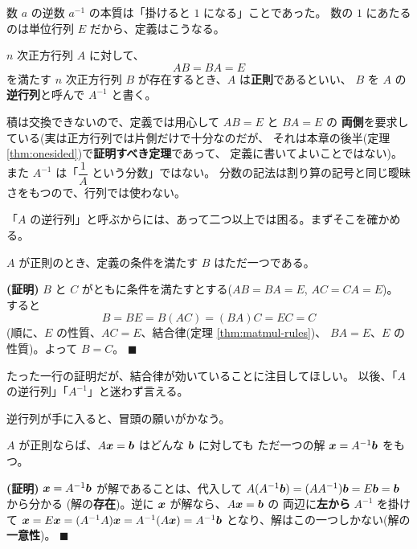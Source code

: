 数 $a$ の逆数 $a^{-1}$ の本質は「掛けると $1$ になる」ことであった。
数の $1$ にあたるのは単位行列 $E$ だから、定義はこうなる。

\begin{teigi}[逆行列]
$n$ 次正方行列 $A$ に対して、
\[
AB = BA = E
\]
を満たす $n$ 次正方行列 $B$ が存在するとき、$A$ は\textbf{正則}であるといい、
$B$ を $A$ の\textbf{逆行列}と呼んで $A^{-1}$ と書く。
\end{teigi}

\begin{chui}
積は交換できないので、定義では用心して $AB = E$ と $BA = E$ の
\textbf{両側}を要求している(実は正方行列では片側だけで十分なのだが、
それは本章の後半(定理 \ref{thm:onesided})で\textbf{証明すべき定理}であって、
定義に書いてよいことではない)。
また $A^{-1}$ は「$\dfrac{1}{A}$ という分数」ではない。
分数の記法は割り算の記号と同じ曖昧さをもつので、行列では使わない。
\end{chui}

「$A$ の逆行列」と呼ぶからには、あって二つ以上では困る。まずそこを確かめる。

\begin{teiri}[逆行列の一意性]\label{thm:inv-unique}
$A$ が正則のとき、定義の条件を満たす $B$ はただ一つである。
\end{teiri}

\noindent\textbf{(証明)}\quad
$B$ と $C$ がともに条件を満たすとする($AB = BA = E$, $AC = CA = E$)。
すると
\[
B = BE = B(AC) = (BA)C = EC = C
\]
(順に、$E$ の性質、$AC = E$、結合律(定理 \ref{thm:matmul-rules})、
$BA = E$、$E$ の性質)。よって $B = C$。 $\blacksquare$

たった一行の証明だが、結合律が効いていることに注目してほしい。
以後、「$A$ の逆行列」「$A^{-1}$」と迷わず言える。

逆行列が手に入ると、冒頭の願いがかなう。

\begin{teiri}[逆行列で方程式が解ける]\label{thm:inv-solve}
$A$ が正則ならば、$A\bm{x} = \bm{b}$ はどんな $\bm{b}$ に対しても
ただ一つの解 $\bm{x} = A^{-1}\bm{b}$ をもつ。
\end{teiri}

\noindent\textbf{(証明)}\quad
$\bm{x} = A^{-1}\bm{b}$ が解であることは、代入して
$A(A^{-1}\bm{b}) = (AA^{-1})\bm{b} = E\bm{b} = \bm{b}$ から分かる
(解の\textbf{存在})。逆に $\bm{x}$ が解なら、$A\bm{x} = \bm{b}$ の
両辺に\textbf{左から} $A^{-1}$ を掛けて
$\bm{x} = E\bm{x} = (A^{-1}A)\bm{x} = A^{-1}(A\bm{x}) = A^{-1}\bm{b}$
となり、解はこの一つしかない(解の\textbf{一意性})。 $\blacksquare$


